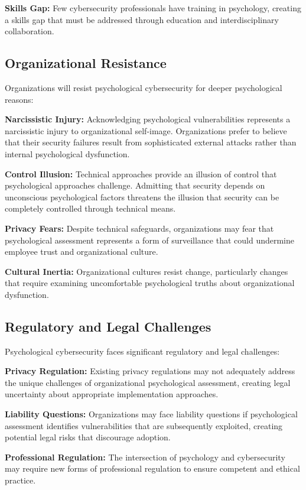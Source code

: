 \documentclass[10pt, twocolumn]{article}
\begin{document}
\textbf{Skills Gap:} Few cybersecurity professionals have training in psychology, creating a skills gap that must be addressed through education and interdisciplinary collaboration.

\subsection{Organizational Resistance}

Organizations will resist psychological cybersecurity for deeper psychological reasons:

\textbf{Narcissistic Injury:} Acknowledging psychological vulnerabilities represents a narcissistic injury to organizational self-image. Organizations prefer to believe that their security failures result from sophisticated external attacks rather than internal psychological dysfunction.

\textbf{Control Illusion:} Technical approaches provide an illusion of control that psychological approaches challenge. Admitting that security depends on unconscious psychological factors threatens the illusion that security can be completely controlled through technical means.

\textbf{Privacy Fears:} Despite technical safeguards, organizations may fear that psychological assessment represents a form of surveillance that could undermine employee trust and organizational culture.

\textbf{Cultural Inertia:} Organizational cultures resist change, particularly changes that require examining uncomfortable psychological truths about organizational dysfunction.

\subsection{Regulatory and Legal Challenges}

Psychological cybersecurity faces significant regulatory and legal challenges:

\textbf{Privacy Regulation:} Existing privacy regulations may not adequately address the unique challenges of organizational psychological assessment, creating legal uncertainty about appropriate implementation approaches.

\textbf{Liability Questions:} Organizations may face liability questions if psychological assessment identifies vulnerabilities that are subsequently exploited, creating potential legal risks that discourage adoption.

\textbf{Professional Regulation:} The intersection of psychology and cybersecurity may require new forms of professional regulation to ensure competent and ethical practice.
\end{document}
